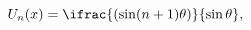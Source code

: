 \[\mathop{U_{n}\/}\nolimits\!\left(x\right)=\ifrac{(\mathop{\sin\/}\nolimits(n+1%
)\theta)}{\mathop{\sin\/}\nolimits\theta},\]